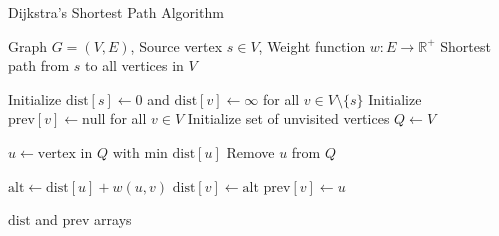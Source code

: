 \begin{algorithm}[H]
\caption{Dijkstra's Shortest Path Algorithm}
\label{alg:dijkstra}
\begin{algorithmic}[1]
\Require Graph $G = (V, E)$, Source vertex $s \in V$, Weight function $w: E \rightarrow \mathbb{R}^+$
\Ensure Shortest path from $s$ to all vertices in $V$

\State Initialize $\text{dist}[s] \gets 0$ and $\text{dist}[v] \gets \infty$ for all $v \in V \setminus \{s\}$
\State Initialize $\text{prev}[v] \gets \text{null}$ for all $v \in V$
\State Initialize set of unvisited vertices $Q \gets V$

    \State $u \gets \text{vertex in } Q \text{ with min } \text{dist}[u]$ 
    \State Remove $u$ from $Q$
    
        \State $\text{alt} \gets \text{dist}[u] + w(u, v)$ 
            \State $\text{dist}[v] \gets \text{alt}$ 
            \State $\text{prev}[v] \gets u$ 
        \EndIf
    \EndFor
\EndWhile

\State \Return $\text{dist}$ and $\text{prev}$ arrays
\end{algorithmic}
\end{algorithm}
